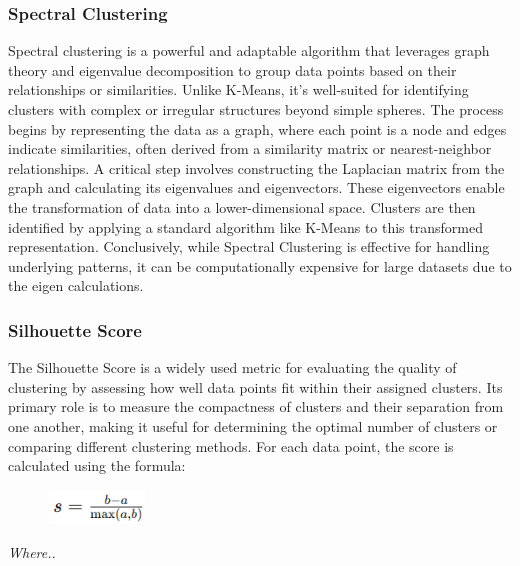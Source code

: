 \documentclass[11pt]{article}
\begin{document}
\vspace{1\baselineskip}
\subsubsection{Spectral Clustering}

Spectral clustering is a powerful and adaptable algorithm that leverages graph theory and eigenvalue decomposition to group data points based on their relationships or similarities. Unlike K-Means, it’s well-suited for identifying clusters with complex or irregular structures beyond simple spheres. The process begins by representing the data as a graph, where each point is a node and edges indicate similarities, often derived from a similarity matrix or nearest-neighbor relationships. A critical step involves constructing the Laplacian matrix from the graph and calculating its eigenvalues and eigenvectors. These eigenvectors enable the transformation of data into a lower-dimensional space. Clusters are then identified by applying a standard algorithm like K-Means to this transformed representation. Conclusively, while Spectral Clustering is effective for handling underlying patterns, it can be computationally expensive for large datasets due to the eigen calculations.

\vspace{1\baselineskip}
\subsubsection{Silhouette Score}

The Silhouette Score is a widely used metric for evaluating the quality of clustering by assessing how well data points fit within their assigned clusters. Its primary role is to measure the compactness of clusters and their separation from one another, making it useful for determining the optimal number of clusters or comparing different clustering methods. For each data point, the score is calculated using the formula:

\begin{figure}[H]
\centering
\includegraphics[width=2.61cm,height=0.91cm]{./images/image17.png}
\end{figure}


\textit{Where..}
\end{document}
